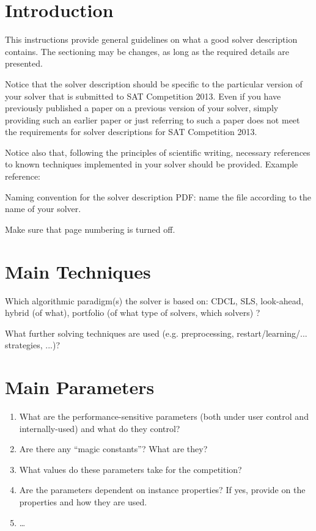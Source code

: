 \documentclass[conference]{IEEEtran}
\begin{document}
\section{Introduction}

This instructions provide general guidelines on what a good solver description contains. 
The sectioning may be changes, as long as the required details are presented.

Notice that the solver description should be specific to the particular version of your solver that 
is submitted to SAT Competition 2013. Even if you have previously published a paper
on a previous version of your solver, simply providing such an earlier paper 
or just referring to such a paper does not meet the requirements for solver descriptions
for SAT Competition 2013.

Notice also that, following the principles of scientific writing, necessary references
to known techniques implemented in your solver should be provided.
Example reference: \cite{JeroslowWang:1990}

Naming convention for the solver description PDF: 
name the file according to the name of your solver.

Make sure that page numbering is turned off.

\section{Main Techniques}

Which algorithmic paradigm(s) the solver is based on: CDCL, SLS, look-ahead, hybrid (of what), portfolio (of what type of solvers, which solvers) ? 

What further solving techniques are used (e.g. preprocessing, restart/learning/... strategies, ...)?


\section{Main Parameters}



\begin{enumerate}
\item What are the performance-sensitive parameters (both under user control and 
internally-used) and what do they control? 
\item Are there any ``magic constants''? What are they?
\item What values do these parameters take for the competition? 
\item Are the parameters dependent on instance properties? If yes, provide 
on the properties and how they are used.
\item \ldots
\end{enumerate}
\end{document}

